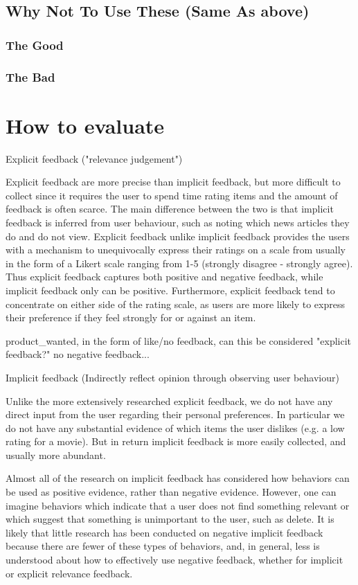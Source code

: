 \subsection{Why Not To Use These (Same As above)}
\subsubsection{The Good}
\subsubsection{The Bad}

\section{How to evaluate}

Explicit feedback ("relevance judgement")

Explicit feedback are more precise than implicit feedback, but more difficult to collect since it requires the user to spend time rating items and the amount of feedback is often scarce. The main difference between the two is that implicit feedback is inferred from user behaviour, such as noting which news articles they do and do not view. Explicit feedback unlike implicit feedback provides the users with a mechanism to unequivocally express their ratings on a scale from usually in the form of a Likert scale ranging from 1-5 (strongly disagree - strongly agree). Thus explicit feedback captures both positive and negative feedback, while implicit feedback only can be positive. Furthermore, explicit feedback tend to concentrate on either side of the rating scale, as users are more likely to express their preference if they feel strongly for or against an item.

product_wanted, in the form of like/no feedback, can this be considered "explicit feedback?" no negative feedback...

Implicit feedback (Indirectly reflect opinion through observing user behaviour)

Unlike the more extensively researched explicit feedback, we do not have any
direct input from the user regarding their personal preferences. In particular
we do not have any substantial evidence of which items the user dislikes (e.g. a
low rating for a movie). But in return implicit feedback is more easily
collected, and usually more abundant.

Almost all of the research on implicit feedback has considered how behaviors can
be used as positive evidence, rather than negative evidence. However, one can imagine
behaviors which indicate that a user does not ﬁnd something relevant or which suggest
that something is unimportant to the user, such as delete. It is likely that little research
has been conducted on negative implicit feedback because there are fewer of these types
of behaviors, and, in general, less is understood about how to effectively use negative
feedback, whether for implicit or explicit relevance feedback.

